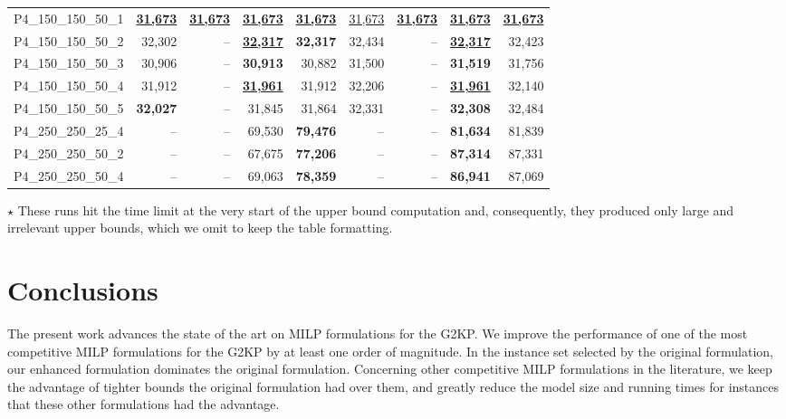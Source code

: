 \documentclass[smallextended]{svjour3}       %
\begin{document}
\begin{table}
\begin{tabular}{lrrrrrrrr}
P4\_150\_150\_50\_1 & \underline{\textbf{31,673}} & \underline{\textbf{31,673}} & \underline{\textbf{31,673}} & \underline{\textbf{31,673}} & \underline{31,673} & \underline{\textbf{31,673}} & \underline{\textbf{31,673}} & \underline{\textbf{31,673}} \\
P4\_150\_150\_50\_2 & 32,302 & -- & \underline{\textbf{32,317}} & \textbf{32,317} & 32,434 & -- & \underline{\textbf{32,317}} & 32,423 \\
P4\_150\_150\_50\_3 & 30,906 & -- & \textbf{30,913} & 30,882 & 31,500 & -- & \textbf{31,519} & 31,756 \\
P4\_150\_150\_50\_4 & 31,912 & -- & \underline{\textbf{31,961}} & 31,912 & 32,206 & -- & \underline{\textbf{31,961}} & 32,140 \\
P4\_150\_150\_50\_5 & \textbf{32,027} & -- & 31,845 & 31,864 & 32,331 & -- & \textbf{32,308} & 32,484 \\
P4\_250\_250\_25\_4 & -- & -- & 69,530 & \textbf{79,476} & -- & -- & \textbf{81,634} & 81,839 \\
P4\_250\_250\_50\_2 & -- & -- & 67,675 & \textbf{77,206} & -- & -- & \textbf{87,314} & 87,331 \\
P4\_250\_250\_50\_4 & -- & -- & 69,063 & \textbf{78,359} & -- & -- & \textbf{86,941} & 87,069 \\\hline\hline
\end{tabular}
\(\star\) These runs hit the time limit at the very start of the upper bound computation and, consequently, they produced only large and irrelevant upper bounds, which we omit to keep the table formatting.
\label{tab:velasco_new_results}
\end{table}

\section{Conclusions}
\label{sec:conclusions}

The present work advances the state of the art on MILP formulations for the G2KP.
We improve the performance of one of the most competitive MILP formulations for the G2KP by at least one order of magnitude.
In the instance set selected by the original formulation, our enhanced formulation dominates the original formulation.
Concerning other competitive MILP formulations in the literature, we keep the advantage of tighter bounds the original formulation had over them, and greatly reduce the model size and running times for instances that these other formulations had the advantage.
\end{document}
